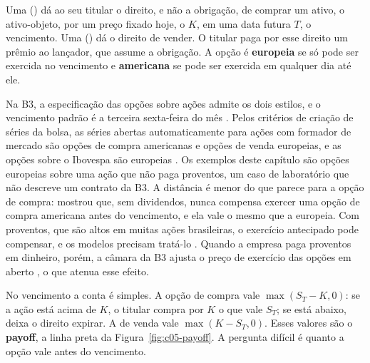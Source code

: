 Uma  () dá ao seu titular o direito, e não a obrigação, de comprar um ativo, o ativo-objeto, por um preço fixado hoje, o  $K$, em uma data futura $T$, o vencimento. Uma  () dá o direito de vender. O titular paga por esse direito um prêmio ao lançador, que assume a obrigação. A opção é \textbf{europeia} se só pode ser exercida no vencimento e \textbf{americana} se pode ser exercida em qualquer dia até ele.

Na B3, a especificação das opções sobre ações admite os dois estilos, e o vencimento padrão é a terceira sexta-feira do mês \citep{b3opcoesacoes}. Pelos critérios de criação de séries da bolsa, as séries abertas automaticamente para ações com formador de mercado são opções de compra americanas e opções de venda europeias, e as opções sobre o Ibovespa são europeias \citep{b3criterios2026}. Os exemplos deste capítulo são opções europeias sobre uma ação que não paga proventos, um caso de laboratório que não descreve um contrato da B3. A distância é menor do que parece para a opção de compra: \citet{merton1973} mostrou que, sem dividendos, nunca compensa exercer uma opção de compra americana antes do vencimento, e ela vale o mesmo que a europeia. Com proventos, que são altos em muitas ações brasileiras, o exercício antecipado pode compensar, e os modelos precisam tratá-lo \citep{hull2022}. Quando a empresa paga proventos em dinheiro, porém, a câmara da B3 ajusta o preço de exercício das opções em aberto \citep{b3oc0812023}, o que atenua esse efeito.

No vencimento a conta é simples. A opção de compra vale $\max(S_T - K, 0)$: se a ação está acima de $K$, o titular compra por $K$ o que vale $S_T$; se está abaixo, deixa o direito expirar. A de venda vale $\max(K - S_T, 0)$. Esses valores são o \textbf{payoff}, a linha preta da Figura~\ref{fig:c05-payoff}. A pergunta difícil é quanto a opção vale antes do vencimento.


